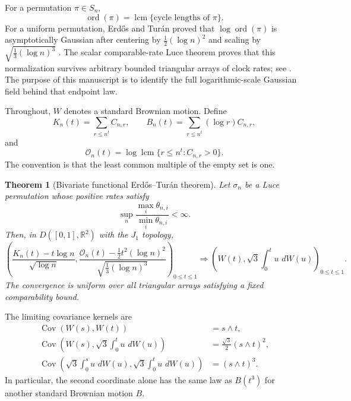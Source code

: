\documentclass[11pt]{article}
\newtheorem{theorem}{Theorem}[section]
\theoremstyle{definition}
\theoremstyle{remark}
\newcommand{\Cov}{\operatorname{Cov}}
\newcommand{\dd}{\,d}
\newcommand{\ord}{\operatorname{ord}}
\newcommand{\lcm}{\operatorname{lcm}}
\newcommand{\cO}{\mathcal O}
\newcommand{\R}{\mathbb R}
\begin{document}
For a permutation $\pi\in S_n$,
\[
 \ord(\pi)=\lcm\{\text{cycle lengths of }\pi\}.
\]
For a uniform permutation, Erd\H{o}s and Tur\'an proved that
$\log\ord(\pi)$ is asymptotically Gaussian after centering by
$\frac12(\log n)^2$ and scaling by $\sqrt{\frac13(\log n)^3}$
\cite{ErdosTuran1967}.  The scalar comparable-rate Luce theorem proves that
this normalization survives arbitrary bounded triangular arrays of clock
rates; see \cite{LongOrder2026}.  The purpose of this manuscript is to
identify the full logarithmic-scale Gaussian field behind that endpoint
law.

Throughout, $W$ denotes a standard Brownian motion.  Define
\begin{equation}\label{eq:processes-intro}
 K_n(t)=\sum_{r\le n^t}C_{n,r},
 \qquad
 B_n(t)=\sum_{r\le n^t}(\log r)C_{n,r},
\end{equation}
and
\begin{equation}\label{eq:order-process-intro}
 \cO_n(t)=\log\lcm\{r\le n^t:C_{n,r}>0\}.
\end{equation}
The convention is that the least common multiple of the empty set is one.

\begin{theorem}[Bivariate functional Erd\H{o}s--Tur\'an theorem]
\label{thm:main-functional}
Let $\sigma_n$ be a Luce permutation whose positive rates satisfy
\[
 \sup_n\frac{\max_i\theta_{n,i}}{\min_i\theta_{n,i}}<\infty.
\]
Then, in $D([0,1],\R^2)$ with the $J_1$ topology,
\begin{equation}\label{eq:main-functional}
 \boxed{
 \left(
 \frac{K_n(t)-t\log n}{\sqrt{\log n}},
 \frac{\cO_n(t)-\frac12t^2(\log n)^2}
      {\sqrt{\frac13(\log n)^3}}
 \right)_{0\le t\le1}
 \Rightarrow
 \left(
 W(t),\sqrt3\int_0^t u\,\dd W(u)
 \right)_{0\le t\le1}.}
\end{equation}
The convergence is uniform over all triangular arrays satisfying a fixed
comparability bound.
\end{theorem}

The limiting covariance kernels are
\begin{align}
 \Cov(W(s),W(t))&=s\wedge t,\label{eq:cov-count-count}\\
 \Cov\left(W(s),\sqrt3\int_0^t u\,\dd W(u)\right)
 &=\frac{\sqrt3}{2}(s\wedge t)^2,\label{eq:cov-count-order}\\
 \Cov\left(\sqrt3\int_0^s u\,\dd W(u),
            \sqrt3\int_0^t u\,\dd W(u)\right)
 &=(s\wedge t)^3.\label{eq:cov-order-order}
\end{align}
In particular, the second coordinate alone has the same law as
$B(t^3)$ for another standard Brownian motion $B$.
\end{document}
